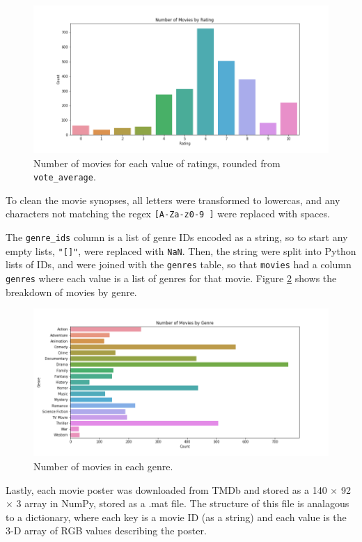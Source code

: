 \documentclass[12pt, oneside]{article}   	%
\begin{document}
\begin{figure}[H]
\includegraphics[width=\textwidth]{rating_barplot}
\caption{\label{fig:rating_barplot}Number of movies for each value of ratings, rounded from \texttt{vote\_average}.}
\end{figure}

To clean the movie synopses, all letters were transformed to lowercas, and any characters not matching the regex \texttt{[A-Za-z0-9 ]} were replaced with spaces.

The \texttt{genre\_ids} column is a list of genre IDs encoded as a string, so to start any empty lists, \texttt{"[]"}, were replaced with \texttt{NaN}. Then, the string were split into Python lists of IDs, and were joined with the \texttt{genres} table, so that \texttt{movies} had a column \texttt{genres} where each value is a list of genres for that movie. Figure \ref{fig:genre_barplot} shows the breakdown of movies by genre.

\begin{figure}[H]
\includegraphics[width=\textwidth]{genre_barplot}
\caption{\label{fig:genre_barplot}Number of movies in each genre.}
\end{figure}

Lastly, each movie poster was downloaded from TMDb and stored as a 140 $\times$ 92 $\times$ 3 array in NumPy, stored as a .mat file. The structure of this file is analagous to a dictionary, where each key is a movie ID (as a string) and each value is the 3-D array of RGB values describing the poster.
\end{document}
